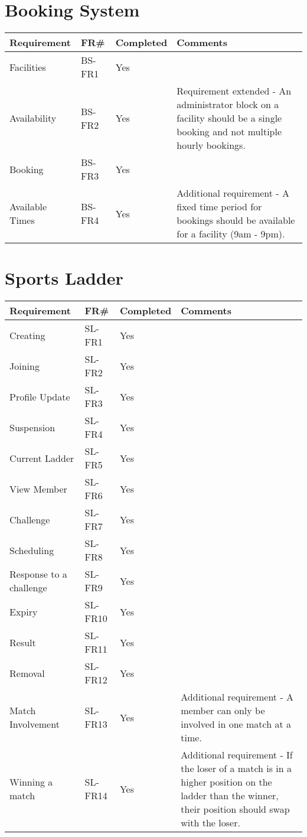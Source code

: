 \section{Booking System}
\begin{tabular}{ |p{5cm}|l|l|p{8cm}|}
\hline
\textbf{Requirement}	&	\textbf{FR\#}	&	\textbf{Completed}	&	\textbf{Comments} \\
\hline
Facilities      									& BS-FR1	& Yes      		&  \\
\hline
Availability   										& BS-FR2	& Yes      		& Requirement extended - An administrator block on a facility should be a single booking and not multiple hourly bookings. \\
\hline
Booking         									& BS-FR3	& Yes      		&  \\
\hline
Available Times 									& BS-FR4	& Yes      		& Additional requirement - A fixed time period for bookings should be available for a facility (9am - 9pm). \\

\hline
\end{tabular}

\section{Sports Ladder}
\begin{tabular}{ |p{5cm}|l|l|p{8cm}|}
\hline
\textbf{Requirement}	&	\textbf{FR\#}	&	\textbf{Completed}	&	\textbf{Comments} \\
\hline
Creating 											& SL-FR1	& Yes 		&  \\
\hline
Joining 											& SL-FR2	& Yes 		&  \\
\hline
Profile Update 										& SL-FR3	& Yes		&  \\
\hline
Suspension 											& SL-FR4	& Yes 		&  \\
\hline
Current Ladder	 									& SL-FR5	& Yes 		&  \\
\hline
View Member											& SL-FR6	& Yes 		&  \\
\hline
Challenge 											& SL-FR7	& Yes		&  \\
\hline
Scheduling 											& SL-FR8	& Yes 		&  \\
\hline
Response to a challenge 							& SL-FR9 	& Yes 		&  \\
\hline
Expiry 												& SL-FR10 	& Yes		&  \\
\hline
Result 												& SL-FR11 	& Yes 		&  \\
\hline
Removal 											& SL-FR12 	& Yes 		&  \\
\hline
Match Involvement									& SL-FR13 	& Yes 		& Additional requirement - A member can only be involved in one match at a time. \\
\hline
Winning a match 									& SL-FR14 	& Yes 		& Additional requirement - If the loser of a match is in a higher position on the ladder than the winner, their position should swap with the loser. \\

\hline
\end{tabular}

